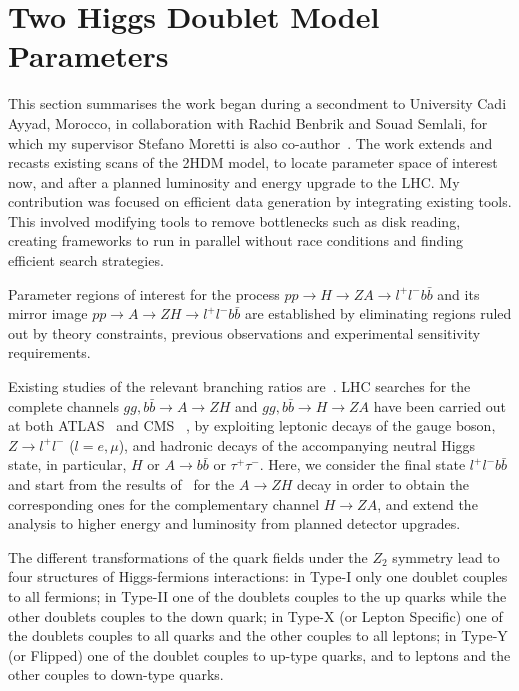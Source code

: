 \section{Two Higgs Doublet Model Parameters}\label{sec:2HDM}

This section summarises the work began during a secondment to University Cadi Ayyad, Morocco,
in collaboration with Rachid Benbrik and Souad Semlali, 
for which my supervisor Stefano Moretti is also co-author~\cite{benbrik2020mapping}.
The work extends and recasts existing scans of the 2HDM model,
to locate parameter space of interest now, and after
a planned luminosity and energy upgrade to the LHC.
My contribution was focused on efficient data generation by integrating existing tools.
This involved modifying tools to remove bottlenecks such as disk reading,
creating frameworks to run in parallel without race conditions 
and finding efficient search strategies.


Parameter regions of interest for the process \(pp\to H\to ZA\to l^+l^-b\bar b\)
and its mirror image \(pp\to A \to ZH\to l^+l^-b\bar{b}\) 
are established by eliminating regions ruled out by theory constraints,
previous observations and experimental sensitivity requirements.

Existing studies of the relevant branching ratios are~\cite{Moretti1994belowThreshold, Djouadi1995twoAndthree, Djouadi1998HDECAY,Krause20202HDECAY}.
LHC searches for the complete channels \(gg,b\bar b\to A\to ZH\) and \(gg, b\bar b\to H\to ZA\) have been carried out at both ATLAS~\cite{Aaboud2018AZHbbll} and CMS ~\cite{Khachatryan2016resonancesbbtautau,Sirunyan2020newneutral},
by exploiting leptonic decays of the gauge boson, \(Z\to l^+l^-\) (\(l=e,\mu\)),  and hadronic decays of
the accompanying neutral Higgs state, in particular, \(H\) or \(A\to b\bar b\) or \(\tau^+\tau^-\).
Here, we consider the final state \( l^+l^- b\bar b\) and start from the results of~\cite{Aaboud2018AZHbbll}
for the \(A\to ZH\) decay in order to obtain the corresponding ones for the complementary channel \(H\to ZA\),
and extend the analysis to higher energy and luminosity from planned detector upgrades.


The different transformations of the quark fields under the \(Z_2\) symmetry lead to four structures of Higgs-fermions interactions:
in Type-I only one doublet couples to all fermions;
in Type-II one of the doublets couples to the up quarks while the other doublets couples to the down quark;
in Type-X (or Lepton Specific)  one of the doublets couples to all quarks and the other couples to all leptons;
in Type-Y (or Flipped) one of the doublet couples to up-type quarks, and to leptons and the other couples to down-type quarks. 
